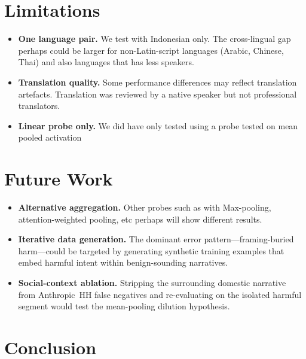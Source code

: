 \documentclass{article}
\begin{document}
\section{Limitations}
\label{sec:limitations}

\begin{itemize}[nosep]
  \item \textbf{One language pair.} We test with Indonesian only.
        The cross-lingual gap perhaps could be larger for non-Latin-script languages
        (Arabic, Chinese, Thai) and also languages that has less speakers. 
  \item \textbf{Translation quality.} Some performance differences may reflect
        translation artefacts.
        Translation was reviewed by a native speaker but not professional
        translators.
  \item \textbf{Linear probe only.} We did have only tested using a probe tested on 
        mean pooled activation
\end{itemize}

\section{Future Work}
\label{sec:future}

\begin{itemize}[nosep]
  \item \textbf{Alternative aggregation.} Other probes such as with Max-pooling, attention-weighted
        pooling, etc perhaps will show different results.
  \item \textbf{Iterative data generation.} The dominant error
        pattern---framing-buried harm---could be targeted by generating
        synthetic training examples that embed harmful intent within
        benign-sounding narratives.
  \item \textbf{Social-context ablation.} Stripping the surrounding domestic
        narrative from Anthropic~HH false negatives and re-evaluating on the
        isolated harmful segment would test the mean-pooling dilution hypothesis.
\end{itemize}

\section{Conclusion}
\label{sec:conclusion}
\end{document}
